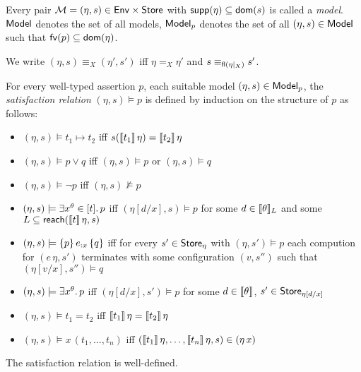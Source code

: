 \documentclass[12pt,a4paper]{report}
\begin{document}
\begin{definition}[Model]
  Every pair $\mathcal{M} = (\eta,s) \in \mathsf{Env} \times \mathsf{Store}$ with $\mathsf{supp}(\eta) \subseteq \mathsf{dom}(s)$
  is called a {\em model}. $\mathsf{Model}$ denotes
  the set of all models, $\mathsf{Model}_p$ denotes the set of all $(\eta,s) \in \mathsf{Model}$ such that
  $\mathsf{fv}(p) \subseteq \mathsf{dom}(\eta)$.
\end{definition}

We write $(\eta,s) \equiv_X (\eta',s')$ iff $\eta =_X \eta'$ and $s \equiv_{\mathsf{fl}(\eta|_X)} s'$.

\begin{definition}
  For every well-typed assertion $p$, each suitable model $(\eta,s) \in \mathsf{Model}_p$, the {\em satisfaction relation}
  $(\eta,s) \models p$ is defined by induction on the structure of $p$ as follows:
  \begin{itemize}
    \item $(\eta,s) \models t_1 \mapsto t_2$ iff $s(\llbracket t_1\rrbracket\,\eta) = \llbracket t_2\rrbracket\,\eta$
    \item $(\eta,s) \models p \vee q$ iff $(\eta,s) \models p$ or $(\eta,s) \models q$
    \item $(\eta,s) \models \neg p$ iff $(\eta,s) \not\models p$
    \item $(\eta,s) \models \exists{x^\theta}\in{[t]}.\,{p}$ iff $(\eta[d/x],s) \models p$ for some
          $d \in \llbracket\theta\rrbracket_L$ and some $L \subseteq \mathsf{reach}(\llbracket t\rrbracket\,\eta,s)$
    \item $(\eta,s) \models \{p\}\,e_{:x}\,\{q\}$ iff for every $s' \in \mathsf{Store}_{\eta}$ with
          $(\eta,s') \models p$ each compution for $(e\,\eta,s')$ terminates with some
          configuration $(v,s'')$ such that $(\eta[v/x],s'')\models q$
    \item $(\eta,s) \models \exists{x^\theta}.\,{p}$ iff $(\eta[d/x],s') \models p$ for some $d \in \llbracket\theta\rrbracket$,
          $s' \in \mathsf{Store}_{\eta[d/x]}$
    \item $(\eta,s) \models t_1 = t_2$ iff $\llbracket t_1\rrbracket\,\eta = \llbracket t_2\rrbracket\,\eta$
    \item $(\eta,s) \models x\,(t_1,\ldots,t_n)$ iff $(\llbracket t_1\rrbracket\,\eta,\ldots,\llbracket t_n\rrbracket\,\eta,s)\in (\eta\,x)$
  \end{itemize}
\end{definition}

\begin{lemma}
  The satisfaction relation is well-defined.
\end{lemma}
\end{document}
